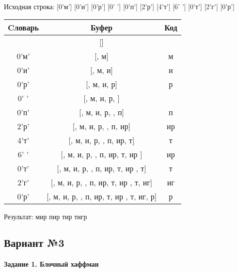 \documentclass[a4paper, 12pt]{article}
\begin{document}
Исходная строка: [0'м'] [0'и'] [0'р'] [0' '] [0'п'] [2'р'] [4'т'] [6' '] [0'т'] [2'г'] [0'р']\\
\begin{table}[h!]
\centering
\begin{tabular}{|c|c|c|}
\hline
 Cловарь & Буфер & Код  \\ \hline
 & [] & 
\\ \hline
0'м' & [, м] & м
\\ \hline
0'и' & [, м, и] & и
\\ \hline
0'р' & [, м, и, р] & р
\\ \hline
0' ' & [, м, и, р,  ] &  
\\ \hline
0'п' & [, м, и, р,  , п] & п
\\ \hline
2'р' & [, м, и, р,  , п, ир] & ир
\\ \hline
4'т' & [, м, и, р,  , п, ир,  т] &  т
\\ \hline
6' ' & [, м, и, р,  , п, ир,  т, ир ] & ир 
\\ \hline
0'т' & [, м, и, р,  , п, ир,  т, ир , т] & т
\\ \hline
2'г' & [, м, и, р,  , п, ир,  т, ир , т, иг] & иг
\\ \hline
0'р' & [, м, и, р,  , п, ир,  т, ир , т, иг, р] & р
\\ \hline
\end{tabular}
\end{table}

Результат: мир пир тир тигр
\pagebreak
\subsection{Вариант №3}
\paragraph{Задание 1. Блочный хаффман \\}
\end{document}
